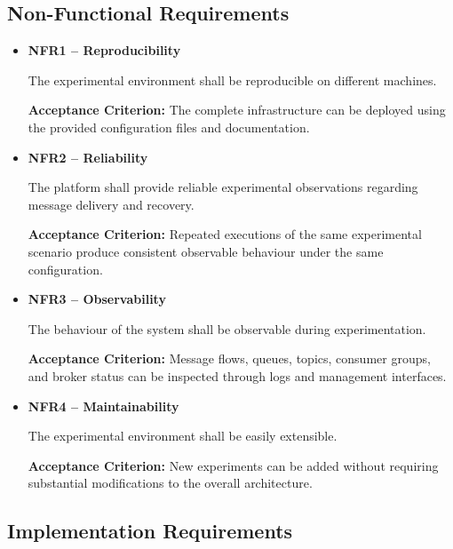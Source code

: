 \documentclass{scrartcl}
\begin{document}
\subsection{Non-Functional Requirements}

\begin{itemize}

\item \textbf{NFR1 -- Reproducibility}

The experimental environment shall be reproducible on different machines.

\textbf{Acceptance Criterion:}
The complete infrastructure can be deployed using the provided configuration files and documentation.

\item \textbf{NFR2 -- Reliability}

The platform shall provide reliable experimental observations regarding message delivery and recovery.

\textbf{Acceptance Criterion:}
Repeated executions of the same experimental scenario produce consistent observable behaviour under the same configuration.

\item \textbf{NFR3 -- Observability}

The behaviour of the system shall be observable during experimentation.

\textbf{Acceptance Criterion:}
Message flows, queues, topics, consumer groups, and broker status can be inspected through logs and management interfaces.

\item \textbf{NFR4 -- Maintainability}

The experimental environment shall be easily extensible.

\textbf{Acceptance Criterion:}
New experiments can be added without requiring substantial modifications to the overall architecture.

\end{itemize}

\subsection{Implementation Requirements}
\end{document}
